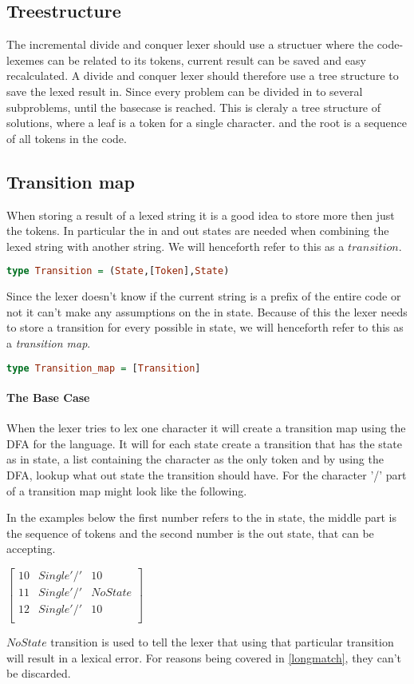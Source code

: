 \subsection{Treestructure} %
The incremental divide and conquer lexer should use a structuer where the
code-lexemes can be related to its tokens, current result can be saved and easy
recalculated. A divide and conquer lexer should therefore use a tree structure
to save the lexed result in. Since every problem can be divided in to several
subproblems, until the basecase is reached. This is cleraly a tree structure of
solutions, where a leaf is a token for a single character. and the root
is a sequence of all tokens in the code.  



\subsection{Transition map} %
When storing a result of a lexed string it is a good idea to store more then
just the tokens. In particular the in and out states are needed when combining
the lexed string with another string. We will henceforth refer to this as a
$transition$.
\begin{lstlisting}[language=Haskell]
type Transition = (State,[Token],State)
\end{lstlisting}
Since the lexer doesn't know if the current string is a prefix of the entire
code or not it can't make any assumptions on the in state. Because of this the
lexer needs to store a transition for every possible in state, we will henceforth
refer to this as a \emph{transition map}.
\begin{lstlisting}[language=Haskell]
type Transition_map = [Transition]
\end{lstlisting}
\paragraph{The Base Case}
When the lexer tries to lex one character it will create a transition
map using the DFA for the language. It will for each state create a transition
that has the state as in state, a list containing the character as the only
token and by using the DFA, lookup what out state the transition should have.
For the character '/' part of a transition map might look like the following.

In the
examples below the first number refers to the in state, the middle part is the
sequence of tokens and the second number is the out state, that can be accepting.
\begin{center}
$\left[\begin{array}{ccc}
10&Single '/'&10\\
11&Single '/'&NoState\\
12&Single '/'&10\\
\end{array}\right]$
\end{center}
$NoState$ transition is used to tell the lexer that using that particular 
transition will result in a lexical error. For reasons being covered in
\cref{longmatch}, they can't be discarded.

